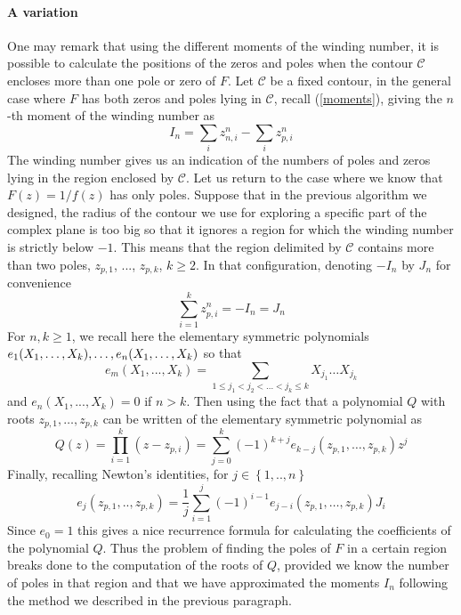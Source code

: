 \documentclass[11pt]{report}
\numberwithin{equation}{section}
\begin{document}
\paragraph{A variation}
One may remark that using the different moments of the winding number, it is possible to calculate the positions of the zeros and poles when the contour $\mathcal{C}$ encloses more than one pole or zero of $F$. Let $\mathcal{C}$ be a fixed contour, in the general case where $F$ has both zeros and poles lying in $\mathcal{C}$, recall (\ref{moments}), giving the $n$-th moment of the winding number as
%
\begin{equation}
  I_n = \sum_i z_{n,i}^{n} - \sum_i z_{p,i}^{n}
\end{equation}
%
The winding number gives us an indication of the numbers of poles and zeros lying in the region enclosed by $\mathcal{C}$. Let us return to the case where we know that $F(z) = 1/f(z)$ has only poles. Suppose that in the previous algorithm we designed, the radius of the contour we use for exploring a specific part of the complex plane is too big so that it ignores a region for which the winding number is strictly below $-1$. This means that the region delimited by $\mathcal{C}$ contains more than two poles, $z_{p,1}$, ..., $z_{p,k}$, $k \geq 2$. In that configuration, denoting $-I_n$ by $J_n$ for convenience
%
\begin{equation}
  \sum_{i=1}^k z_{p,i}^{n} = -I_n = J_n
\end{equation}
%
For $n,k \geq 1$, we recall here the elementary symmetric polynomials $e_1(X_1,\ldots,X_k),\ldots,\\ e_n(X_1,\ldots,X_k)$ so that
%
\begin{equation}
  e_m(X_1,...,X_k) = \sum_{1\leq j_1 < j_2 <...<j_k\leq k} X_{j_1}\ldots X_{j_k}
\end{equation}
%
and $e_n(X_1,...,X_k) = 0$ if $n > k$. Then using the fact that a polynomial $Q$ with roots $z_{p,1},\ldots,z_{p,k}$ can be written of the elementary symmetric polynomial as
%
\begin{equation}
	Q(z) = \prod_{i=1}^k \left(z-z_{p,i}\right) = \sum_{j=0}^k \left(-1\right)^{k+j}e_{k-j}\left(z_{p,1},\ldots, z_{p,k}\right)z^j
\end{equation}
%
Finally, recalling Newton's identities, for $j \in \left\{1,..,n\right\}$
%
\begin{equation}
	e_{j}\left(z_{p,1},.., z_{p,k}\right) = \frac{1}{j}\sum_{i=1}^j (-1)^{i-1} e_{j - i} \left(z_{p,1},\ldots, z_{p,k}\right) J_i
\end{equation}
%
Since $e_0 = 1$ this gives a nice recurrence formula for calculating the coefficients of the polynomial $Q$. Thus the problem of finding the poles of $F$ in a certain region breaks done to the computation of the roots of $Q$, provided we know the number of poles in that region and that we have approximated the moments $I_n$ following the method we described in the previous paragraph.
\end{document}
